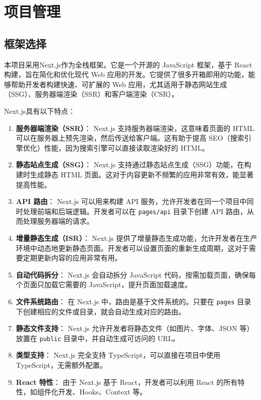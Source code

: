 \chapter{项目管理}
\thispagestyle{empty}
\section{框架选择}
本项目采用Next.js作为全栈框架。它是一个开源的 JavaScript 框架，基于 React 构建，旨在简化和优化现代 Web 应用的开发。它提供了很多开箱即用的功能，能够帮助开发者构建快速、可扩展的 Web 应用，尤其适用于静态网站生成（SSG）、服务器端渲染（SSR）和客户端渲染（CSR）。

Next.js具有以下特点：
\begin{enumerate}
    \item \textbf{服务器端渲染（SSR）}：
    Next.js 支持服务器端渲染，这意味着页面的 HTML 可以在服务器上预先渲染，然后传送给客户端。这有助于提高 SEO（搜索引擎优化）性能，因为搜索引擎可以直接读取渲染好的 HTML。
    
    \item \textbf{静态站点生成（SSG）}：
    Next.js 支持通过静态站点生成（SSG）功能，在构建时生成静态 HTML 页面。这对于内容更新不频繁的应用非常有效，能显著提高性能。
    
    \item \textbf{API 路由}：
    Next.js 可以用来构建 API 服务，允许开发者在同一个项目中同时处理前端和后端逻辑。开发者可以在 \texttt{pages/api} 目录下创建 API 路由，从而处理服务器端的请求。
    
    \item \textbf{增量静态生成（ISR）}：
    Next.js 提供了增量静态生成功能，允许开发者在生产环境中动态地更新静态页面。开发者可以设置页面的重新生成周期，这对于需要定期更新内容的应用非常有用。
    
    \item \textbf{自动代码拆分}：
    Next.js 会自动拆分 JavaScript 代码，按需加载页面，确保每个页面只加载它需要的 JavaScript，提升页面加载速度。
    
    \item \textbf{文件系统路由}：
    在 Next.js 中，路由是基于文件系统的。只要在 \texttt{pages} 目录下创建相应的文件或目录，就会自动生成对应的路由。
    
    \item \textbf{静态文件支持}：
    Next.js 允许开发者将静态文件（如图片、字体、JSON 等）放置在 \texttt{public} 目录中，并自动生成可访问的 URL。
    
    \item \textbf{类型支持}：
    Next.js 完全支持 TypeScript，可以直接在项目中使用 TypeScript，无需额外配置。
    
    \item \textbf{React 特性}：
    由于 Next.js 基于 React，开发者可以利用 React 的所有特性，如组件化开发、Hooks、Context 等。
\end{enumerate}
